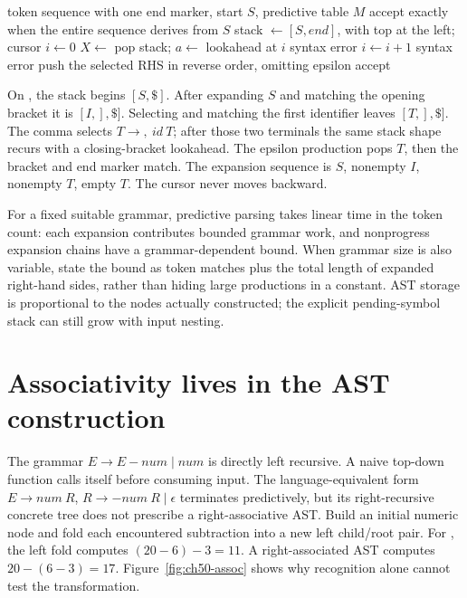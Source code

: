 \begin{algorithm}[htbp]
\caption{Recognize with a conflict-free predictive table.}
\label{alg:ch50-driver}
\begin{pseudocode}
\Require token sequence with one end marker, start $S$, predictive table $M$
\Ensure accept exactly when the entire sequence derives from $S$
\State stack $\gets [S,end]$, with top at the left; cursor $i\gets0$
  \State $X\gets$ pop stack; $a\gets$ lookahead at $i$
     \State \Return syntax error \EndIf
    \State $i\gets i+1$
  \Else
     \State \Return syntax error \EndIf
    \State push the selected RHS in reverse order, omitting epsilon
  \EndIf
\EndWhile
\State \Return accept
\end{pseudocode}
\end{algorithm}

On \code{[id,id]}, the stack begins $[S,\$]$.
After expanding $S$ and matching the opening bracket it is $[I,],\$]$.
Selecting and matching the first identifier leaves $[T,],\$]$.
The comma selects $T\to,\ \mathit{id}\ T$; after those two terminals the same stack shape recurs with a closing-bracket lookahead.
The epsilon production pops $T$, then the bracket and end marker match.
The expansion sequence is $S$, nonempty $I$, nonempty $T$, empty $T$.
The cursor never moves backward.

For a fixed suitable grammar, predictive parsing takes linear time in the token count: each expansion contributes bounded grammar work, and nonprogress expansion chains have a grammar-dependent bound.
When grammar size is also variable, state the bound as token matches plus the total length of expanded right-hand sides, rather than hiding large productions in a constant.
AST storage is proportional to the nodes actually constructed; the explicit pending-symbol stack can still grow with input nesting.

\section{Associativity lives in the AST construction}
\label{sec:ch50-associativity}

The grammar $E\to E-\mathit{num}\mid\mathit{num}$ is directly left recursive.
A naive top-down function calls itself before consuming input.
The language-equivalent form $E\to\mathit{num}\ R$, $R\to-\mathit{num}\ R\mid\epsilon$ terminates predictively, but its right-recursive concrete tree does not prescribe a right-associative AST.
Build an initial numeric node and fold each encountered subtraction into a new left child/root pair.
For , the left fold computes $(20-6)-3=11$.
A right-associated AST computes $20-(6-3)=17$.
Figure~\ref{fig:ch50-assoc} shows why recognition alone cannot test the transformation.

